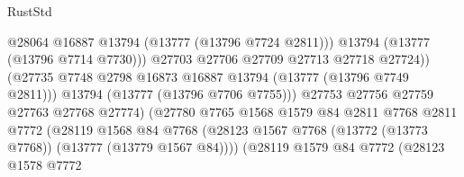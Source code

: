 \begin{lexlean}{RustStd}
\begin{coremodule}
                                                @28064
                                                @16887
                                                @13794
                                                (@13777 (@13796 @7724 @2811)))
                                              @13794
                                              (@13777 (@13796 @7714 @7730)))
                                            @27703
                                            @27706
                                            @27709
                                            @27713
                                            @27718
                                            @27724))
                                        (@27735
                                          @7748
                                          @2798
                                          @16873
                                          @16887
                                          @13794
                                          (@13777 (@13796 @7749 @2811)))
                                        @13794
                                        (@13777 (@13796 @7706 @7755)))
                                      @27753
                                      @27756
                                      @27759
                                      @27763
                                      @27768
                                      @27774)
                                    (@27780
                                      @7765
                                      @1568
                                      @1579
                                      @84
                                      @2811
                                      @7768
                                      @2811
                                      @7772
                                      (@28119
                                        @1568
                                        @84
                                        @7768
                                        (@28123
                                          @1567
                                          @7768
                                          (@13772 (@13773 @7768))
                                          (@13777 (@13779 @1567 @84))))
                                      (@28119
                                        @1579
                                        @84
                                        @7772
                                        (@28123
                                          @1578
                                          @7772

\end{coremodule}
\end{lexlean}
